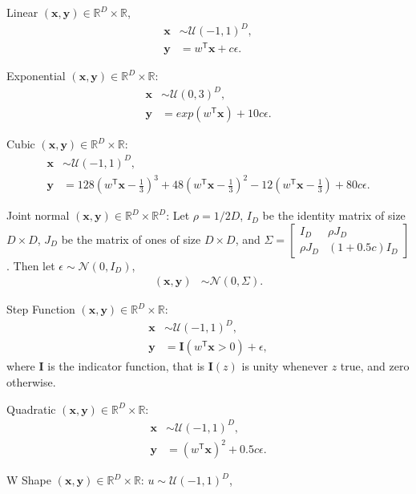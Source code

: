 \documentclass[11pt]{article}
\providecommand{\mb}[1]{\boldsymbol{#1}}
\providecommand{\mc}[1]{\mathcal{#1}}
\newcommand{\Real}{\mathbb{R}}
\newcommand{\T}{^{\ensuremath{\mathsf{T}}}}           %
\begin{document}
\setcounter{equation}{0}
\begin{compactenum}
\item Linear $(\mb{x},\mb{y}) \in \Real^{D} \times \Real$,
\begin{align*}
\mb{x} &\sim \mc{U}(-1,1)^{D},\\
\mb{y} &=w\T \mb{x}+c\epsilon.
\end{align*}
\item Exponential $(\mb{x},\mb{y}) \in \Real^{D} \times \Real$:
\begin{align*}
\mb{x} &\sim \mc{U}(0,3)^{D}, \\
\mb{y} &=exp(w\T \mb{x})+10c\epsilon.
\end{align*}
\item Cubic $(\mb{x},\mb{y}) \in \Real^{D} \times \Real$:
\begin{align*}
\mb{x} &\sim \mc{U}(-1,1)^{D}, \\
\mb{y} &=128(w\T \mb{x}-\tfrac{1}{3})^3+48(w\T \mb{x}-\tfrac{1}{3})^2-12(w\T \mb{x}-\tfrac{1}{3})+80c\epsilon.
\end{align*}
\item Joint normal $(\mb{x},\mb{y}) \in \Real^{D} \times \Real^{D}$: Let $\rho=1/2D$, $I_{D}$ be the identity matrix of size $D \times D$, $J_{D}$ be the matrix of ones of size $D \times D$, and $\Sigma = \begin{bmatrix} I_{D}&\rho J_{D}\\ \rho J_{D}& (1+0.5c) I_{D} \end{bmatrix}$. Then let $\epsilon \sim \mc{N}(0, I_{D})$,
\begin{align*}
(\mb{x}, \mb{y}) &\sim \mc{N}(0, \Sigma). 
\end{align*}
\item Step Function $(\mb{x},\mb{y}) \in \Real^{D} \times \Real$:
\begin{align*}
\mb{x} &\sim \mc{U}(-1,1)^{D},\\
\mb{y} &=\mb{I}(w\T \mb{x}>0)+\epsilon,
\end{align*}
where $\mb{I}$ is the indicator function, that is $\mb{I}(z)$ is unity whenever $z$ true, and zero otherwise.
\item Quadratic $(\mb{x},\mb{y}) \in \Real^{D} \times \Real$:
\begin{align*}
\mb{x} &\sim \mc{U}(-1,1)^{D},\\
\mb{y}&=(w\T \mb{x})^2+0.5c\epsilon.
\end{align*}
\item W Shape $(\mb{x},\mb{y}) \in \Real^{D} \times \Real$:  $u \sim \mc{U}(-1,1)^{D}$,

\end{compactenum}
\end{document}
